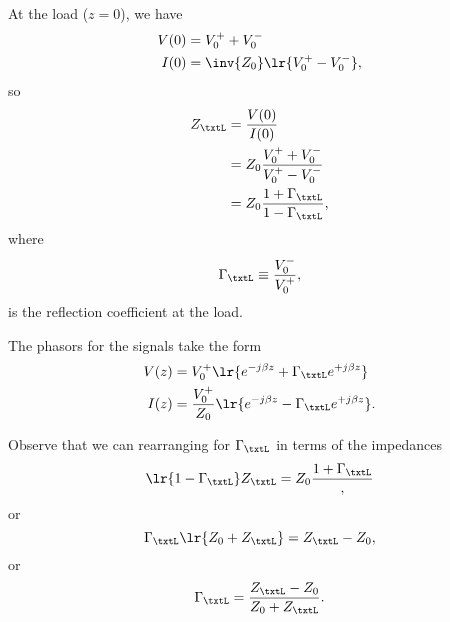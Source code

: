 At the load (\( z = 0 \)), we have
\begin{equation}\label{eqn:uwaves4TransmissionLines:860}
\begin{aligned}
V(0) &= V_0^{+} + V_0^{-} \\
I(0) &= \inv{Z_0} \lr{ V_0^{+} - V_0^{-} },
\end{aligned}
\end{equation}
so
\begin{equation}\label{eqn:uwaves4TransmissionLines:880}
\begin{aligned}
Z_\txtL
&= \frac{V(0)}{I(0)}
\\ &= Z_0 \frac{ V_0^{+} + V_0^{-} }{ V_0^{+} - V_0^{-} }
\\ &= Z_0 \frac{ 1 + \Gamma_\txtL }{1 - \Gamma_\txtL },
\end{aligned}
\end{equation}
where
\begin{equation}\label{eqn:uwaves4TransmissionLines:900}
\Gamma_\txtL \equiv \frac{V_0^{-} }{V_0^{+}},
\end{equation}
is the reflection coefficient at the load.

The phasors for the signals take the form
\begin{equation}\label{eqn:uwaves4TransmissionLines:920}
\begin{aligned}
V(z) &= V_0^{+} \lr{ e^{-j \beta z} + \Gamma_\txtL e^{+j \beta z} } \\
I(z) &= \frac{V_0^{+}}{Z_0} \lr{ e^{-j \beta z} - \Gamma_\txtL e^{+j \beta z} }.
\end{aligned}
\end{equation}

Observe that we can rearranging for \( \Gamma_\txtL \) in terms of the impedances
\begin{equation}\label{eqn:uwaves4TransmissionLines:940}
\lr{ 1 - \Gamma_\txtL } Z_\txtL = Z_0 \frac{ 1 + \Gamma_\txtL },
\end{equation}
or
\begin{equation}\label{eqn:uwaves4TransmissionLines:960}
\Gamma_\txtL \lr{ Z_0 + Z_\txtL } = Z_\txtL - Z_0,
\end{equation}
or
\begin{equation}\label{eqn:uwaves4TransmissionLines:980}
\Gamma_\txtL
= \frac{Z_\txtL - Z_0}
{ Z_0 + Z_\txtL } .
\end{equation}
